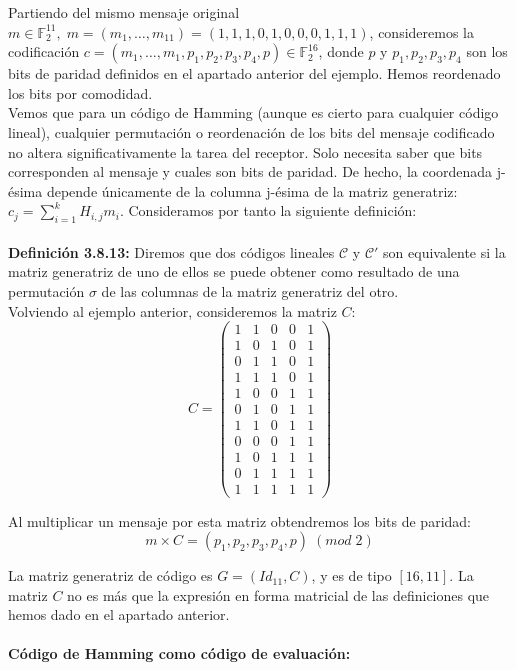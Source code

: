 \documentclass[11pt,spanish]{book}
\begin{document}
Partiendo del mismo mensaje original $m\in \mathbb{F}_{2}^{11},\;m=(m_{1},\ldots,m_{11})=(1,1,1,0,1,0,0,0,1,1,1)$, consideremos la codificación $c=(m_1,\ldots,m_1,p_1,p_2,p_3,p_4,p)\in \mathbb{F}_{2}^{16}$, donde $p$ y $p_1,p_2,p_3,p_4$ son los bits de paridad definidos en el apartado anterior del ejemplo. Hemos reordenado los bits por comodidad.\\

Vemos que para un código de Hamming (aunque es cierto para cualquier código lineal), cualquier permutación o reordenación de los bits del mensaje codificado no altera significativamente la tarea del receptor. Solo necesita saber que bits corresponden al mensaje y cuales son bits de paridad. De hecho, la coordenada j-ésima depende únicamente de la columna j-ésima de la matriz generatriz: $c_j=\sum_{i=1}^{k}H_{i,j}m_{i}$. Consideramos por tanto la siguiente definición:\\
\\ \textbf{Definición 3.8.13: } Diremos que dos códigos lineales $\mathcal{C}$ y $\mathcal{C}'$ son equivalente si la matriz generatriz de uno de ellos se puede obtener como resultado de una permutación $\sigma$ de las columnas de la matriz generatriz del otro.\\

Volviendo al ejemplo anterior, consideremos la matriz $C$:
$$C=
\begin{pmatrix}
1 & 1 & 0 & 0 & 1\\
1 & 0 & 1 & 0 & 1\\
0 & 1 & 1 & 0 & 1\\
1 & 1 & 1 & 0 & 1\\
1 & 0 & 0 & 1 & 1\\
0 & 1 & 0 & 1 & 1\\
1 & 1 & 0 & 1 & 1\\
0 & 0 & 0 & 1 & 1\\
1 & 0 & 1 & 1 & 1\\
0 & 1 & 1 & 1 & 1\\
1 & 1 & 1 & 1 & 1
\end{pmatrix}
$$

Al multiplicar un mensaje por esta matriz obtendremos los bits de paridad:
$$m\times C = (p_1,p_2,p_3,p_4,p)\;(mod\; 2)$$

La matriz generatriz de código es $G=(Id_{11},C)$, y es de tipo $[16,11]$. La matriz $C$ no es más que la expresión en forma matricial de las definiciones que hemos dado en el apartado anterior.\\
\\\textbf{Código de Hamming como código de evaluación: }\\
\end{document}
